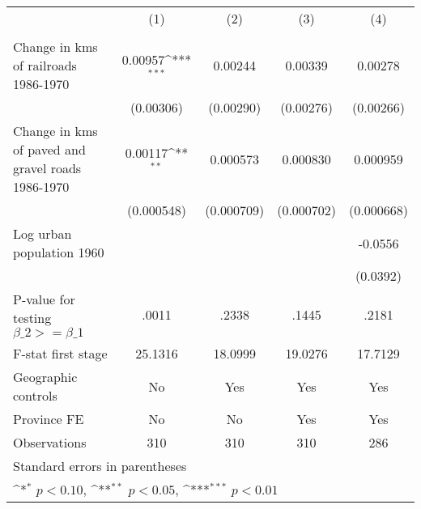{
\def\sym#1{\ifmmode^{#1}\else\(^{#1}\)\fi}
\begin{tabular}{l*{4}{c}}
\hline\hline
                &\multicolumn{1}{c}{(1)}&\multicolumn{1}{c}{(2)}&\multicolumn{1}{c}{(3)}&\multicolumn{1}{c}{(4)}\\
                &\multicolumn{1}{c}{}&\multicolumn{1}{c}{}&\multicolumn{1}{c}{}&\multicolumn{1}{c}{}\\
\hline
Change in kms of railroads 1986-1970&  0.00957\sym{***}&  0.00244         &  0.00339         &  0.00278         \\
                &(0.00306)         &(0.00290)         &(0.00276)         &(0.00266)         \\
[1em]
Change in kms of paved and gravel roads 1986-1970&  0.00117\sym{**} & 0.000573         & 0.000830         & 0.000959         \\
                &(0.000548)         &(0.000709)         &(0.000702)         &(0.000668)         \\
[1em]
Log urban population 1960&                  &                  &                  &  -0.0556         \\
                &                  &                  &                  & (0.0392)         \\
\hline
P-value for testing $\beta\_{2} >= \beta\_{1}$&    .0011         &    .2338         &    .1445         &    .2181         \\
F-stat first stage&  25.1316         &  18.0999         &  19.0276         &  17.7129         \\
Geographic controls&       No         &      Yes         &      Yes         &      Yes         \\
Province FE     &       No         &       No         &      Yes         &      Yes         \\
Observations    &      310         &      310         &      310         &      286         \\
\hline\hline
\multicolumn{5}{l}{\footnotesize Standard errors in parentheses}\\
\multicolumn{5}{l}{\footnotesize \sym{*} \(p<0.10\), \sym{**} \(p<0.05\), \sym{***} \(p<0.01\)}\\
\end{tabular}
}
